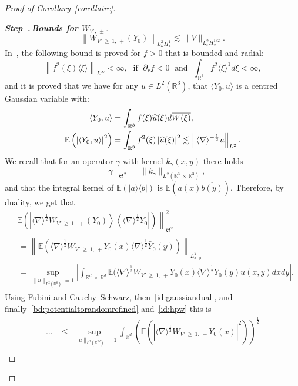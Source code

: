 \documentclass[10pt]{amsart}
\theoremstyle{definition}\newtheorem{defi}[theo]{Definition}\newtheorem{rema}[theo]{Remark}\newtheorem{exam}[theo]{Example}\newtheorem{exem}[theo]{Example}\newtheorem{nota}[theo]{Notation}
\newcommand{\R}{\mathbb{R}}
\newcommand{\E}{\mathbb{E}}
\newcommand{\frkS}{\mathfrak{S}}
\newcommand{\pa}{\partial}
\newcounter{stepcount}
\newenvironment{step}[1]{\refstepcounter{stepcount}\begin{proof}[{\bf{Step~\thestepcount}{.\,\emph{#1}}}]}{\let\qed\relax\end{proof}}
\let\oldhat\hat
\renewcommand*{\hat}[1]{\mathchoice{\widehat{#1}}{\widehat{#1}}{\oldhat{#1}}{\oldhat{#1}}}
\begin{document}
\begin{proof}[Proof of Corollary~\ref{corollaire}]
\begin{step}{{Bounds for $W_{V',\,\pm}$}}
\begin{equation}
\left\| W_{V'\,\geq\,1,\,+}(Y_0)\right\|_{L^2_\omega H^{1}_x}\lesssim \| V\|_{L^2_tH^{1/2}_x}.
\end{equation} In~\cite[Appendix~A]{CodS}, the following bound is proved for $f>0$ that is bounded and radial:
\begin{equation} \label{bd:pointwisefweighted}
\left\| f^2(\xi) \langle \xi \rangle \right\|_{L^{\infty}}<\infty, \; \text{ if }\; \pa_r f<0 \;\text{ and }\; \int_{\R^3} f^2\langle \xi \rangle^{1}d\xi<\infty,
\end{equation}
and it is proved that we have for any $u\in L^2(\R^3)$, that $\langle Y_0, u \rangle$ is a centred Gaussian variable with:
\begin{equation} \label{id:gaussiandual}
\begin{split}
\langle Y_0, u \rangle &=\int_{\R^3} f(\xi)\hat u(\xi)d\overline{W(\xi)}, \\
\E \left(\left|\langle Y_0, u \rangle\right|^2 \right) &=\int_{\R^3} f^2(\xi)\left|\hat u(\xi)\right|^2\lesssim \left\| \langle \nabla \rangle^{-\frac 12} u \right\|_{L^2}.
\end{split}
\end{equation}
We recall that for an operator $\gamma$ with kernel $k_\gamma (x,y)$ there holds
\[
\| \gamma\|_{\frkS^{2}}=\| k_\gamma \|_{L^2\left(\R^3\,\times\,\R^3\right)},
\]
and that the integral kernel of $\E(|a \rangle \langle b|) $ is $\E (a(x)\overline{b(y)})$. Therefore, by duality, we get that
\begin{multline*}
\left\| \E\left(\left|\langle \nabla \rangle^{\frac 12} W_{V'\,\geq\,1,\,+}(Y_0) \right\rangle \left\langle \langle \nabla \rangle^{\frac 12} Y_0\right|\right) \right\|_{\frkS^{2}}^2 \\
\begin{aligned}
&= \left\|\E \left(\langle \nabla \rangle^{\frac 12}W_{V'\,\geq\,1,\,+}Y_0(x) \langle \nabla\rangle^{\frac 12} \bar Y_0(y)\right)\right\|_{L^2_{x,\,y}}\\
& = \sup_{\| u\|_{L^2\left(\R^{6}\right)}=1} \left| \int_{\R^d\,\times\,\R^d} \E(\langle \nabla \rangle^{\frac 12}W_{V'\,\geq\,1,\,+}Y_0(x) \langle \nabla\rangle^{\frac 12} \bar Y_0(y) u(x,y)dxdy\right|.
\end{aligned}
\end{multline*}
 Using Fubini and Cauchy--Schwarz, then~\eqref{id:gaussiandual}, and finally~\eqref{bd:potentialtorandomrefined} and~\eqref{id:hpw} this is
\begin{align*}
\dots 
&\leq \sup_{\| u\|_{L^2\left(\R^{2d}\right)}=1}\int_{\R^d} \left(\E\left(\left|\langle \nabla \rangle^{\frac 12}W_{V'\,\geq\,1,\,+}Y_0(x)\right|^2\right)\right)^{\frac 12} \\

\end{align*}
\end{step}
\end{proof}
\end{document}
